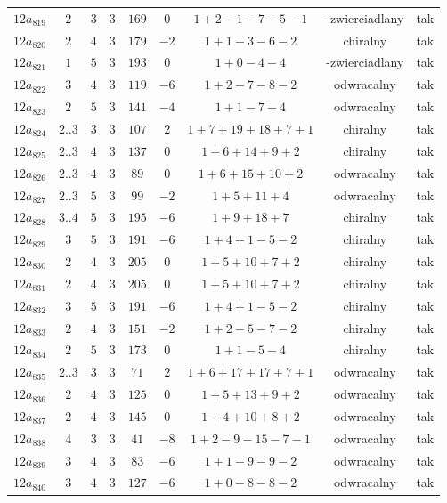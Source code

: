 \begin{longtable}{ccccccccc}
$12a_{819}$ & $2$ & $3$ & $3$ & $169$ & $0$ & $1+2-1-7-5-1$ & -zwierciadlany & tak \\
$12a_{820}$ & $2$ & $4$ & $3$ & $179$ & $-2$ & $1+1-3-6-2$ & chiralny & tak \\
$12a_{821}$ & $1$ & $5$ & $3$ & $193$ & $0$ & $1+0-4-4$ & -zwierciadlany & tak \\
$12a_{822}$ & $3$ & $4$ & $3$ & $119$ & $-6$ & $1+2-7-8-2$ & odwracalny & tak \\
$12a_{823}$ & $2$ & $5$ & $3$ & $141$ & $-4$ & $1+1-7-4$ & odwracalny & tak \\
$12a_{824}$ & $2..3$ & $3$ & $3$ & $107$ & $2$ & $1+7+19+18+7+1$ & chiralny & tak \\
$12a_{825}$ & $2..3$ & $4$ & $3$ & $137$ & $0$ & $1+6+14+9+2$ & chiralny & tak \\
$12a_{826}$ & $2..3$ & $4$ & $3$ & $89$ & $0$ & $1+6+15+10+2$ & odwracalny & tak \\
$12a_{827}$ & $2..3$ & $5$ & $3$ & $99$ & $-2$ & $1+5+11+4$ & odwracalny & tak \\
$12a_{828}$ & $3..4$ & $5$ & $3$ & $195$ & $-6$ & $1+9+18+7$ & chiralny & tak \\
$12a_{829}$ & $3$ & $5$ & $3$ & $191$ & $-6$ & $1+4+1-5-2$ & chiralny & tak \\
$12a_{830}$ & $2$ & $4$ & $3$ & $205$ & $0$ & $1+5+10+7+2$ & chiralny & tak \\
$12a_{831}$ & $2$ & $4$ & $3$ & $205$ & $0$ & $1+5+10+7+2$ & chiralny & tak \\
$12a_{832}$ & $3$ & $5$ & $3$ & $191$ & $-6$ & $1+4+1-5-2$ & chiralny & tak \\
$12a_{833}$ & $2$ & $4$ & $3$ & $151$ & $-2$ & $1+2-5-7-2$ & chiralny & tak \\
$12a_{834}$ & $2$ & $5$ & $3$ & $173$ & $0$ & $1+1-5-4$ & chiralny & tak \\
$12a_{835}$ & $2..3$ & $3$ & $3$ & $71$ & $2$ & $1+6+17+17+7+1$ & odwracalny & tak \\
$12a_{836}$ & $2$ & $4$ & $3$ & $125$ & $0$ & $1+5+13+9+2$ & odwracalny & tak \\
$12a_{837}$ & $2$ & $4$ & $3$ & $145$ & $0$ & $1+4+10+8+2$ & odwracalny & tak \\
$12a_{838}$ & $4$ & $3$ & $3$ & $41$ & $-8$ & $1+2-9-15-7-1$ & odwracalny & tak \\
$12a_{839}$ & $3$ & $4$ & $3$ & $83$ & $-6$ & $1+1-9-9-2$ & odwracalny & tak \\
$12a_{840}$ & $3$ & $4$ & $3$ & $127$ & $-6$ & $1+0-8-8-2$ & odwracalny & tak \\

\end{longtable}
